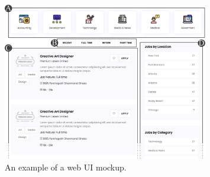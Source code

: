 \begin{figure}
    \centering
    \includegraphics[width=0.8\textwidth]{maintainability/figures/motivating-example}
    \caption{An example of a web UI mockup.}
    \label{fig:motivating-example}
\end{figure} 


